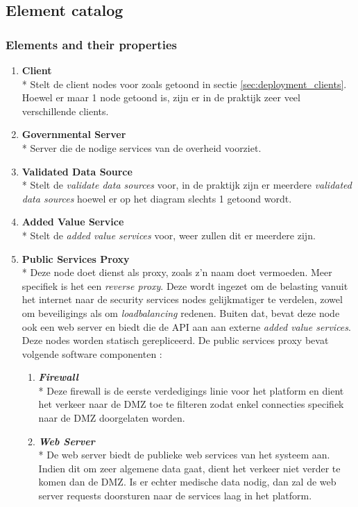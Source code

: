 \documentclass[a4paper,10pt]{article}
\begin{document}
\subsection{Element catalog}

\subsubsection{Elements and their properties}
\begin{enumerate}
 \item \textbf{Client}\\*
Stelt de client nodes voor zoals getoond in sectie \ref{sec:deployment_clients}. Hoewel er maar 1 node getoond is, zijn er in de praktijk zeer veel verschillende clients.
\item \textbf{Governmental Server}\\*
Server die de nodige services van de overheid voorziet.
\item \textbf{Validated Data Source}\\*
Stelt de \textit{validate data sources} voor, in de praktijk zijn er meerdere \textit{validated data sources} hoewel er op het diagram slechts 1 getoond wordt.
\item \textbf{Added Value Service}\\*
Stelt de \textit{added value services} voor, weer zullen dit er meerdere zijn.
\item \textbf{Public Services Proxy}\\*
Deze node doet dienst als proxy, zoals z'n naam doet vermoeden. Meer specifiek is het een \textit{reverse proxy}. Deze wordt ingezet om de belasting vanuit het internet naar de security services nodes gelijkmatiger te verdelen, zowel om beveiligings als om \textit{loadbalancing} redenen. Buiten dat, bevat deze node ook een web server en biedt die de API aan aan externe \textit{added value services}. Deze nodes worden statisch gerepliceerd. De public services proxy bevat volgende software componenten : 
\begin{enumerate}
 \item \textit{\textbf{Firewall}}\\*
 Deze firewall is de eerste verdedigings linie voor het platform en dient het verkeer naar de DMZ toe te filteren zodat enkel connecties specifiek naar de DMZ doorgelaten worden.
\item \textit{\textbf{Web Server}}\\*
De web server biedt de publieke web services van het systeem aan. Indien dit om zeer algemene data gaat, dient het verkeer niet verder te komen dan de DMZ. Is er echter medische data nodig, dan zal de web server requests doorsturen naar de services laag in het platform.

\end{enumerate}
\end{enumerate}
\end{document}

